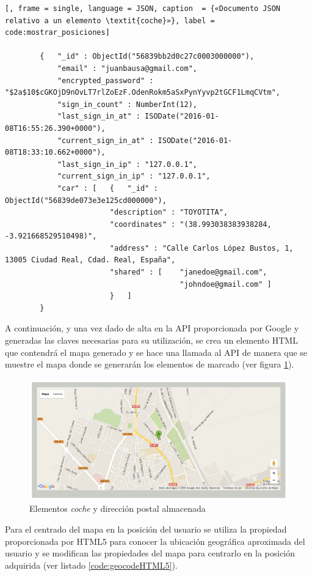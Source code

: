 	\begin{lstlisting}[, frame = single, language = JSON, caption  = {«Documento JSON relativo a un elemento \textit{coche}»}, label = code:mostrar_posiciones]
		
		{   "_id" : ObjectId("56839bb2d0c27c0003000000"), 
		    "email" : "juanbausa@gmail.com", 
		    "encrypted_password" : "$2a$10$cGKOjD9nOvLT7rlZoEzF.OdenRokm5aSxPynYyvp2tGCF1LmqCVtm", 
		    "sign_in_count" : NumberInt(12), 
		    "last_sign_in_at" : ISODate("2016-01-08T16:55:26.390+0000"), 
		    "current_sign_in_at" : ISODate("2016-01-08T18:33:10.662+0000"), 
		    "last_sign_in_ip" : "127.0.0.1", 
		    "current_sign_in_ip" : "127.0.0.1", 
		    "car" : [	{   "_id" : ObjectId("56839de073e3e125cd000000"), 
			            "description" : "TOYOTITA", 
			            "coordinates" : "(38.993038383938284, -3.921668529510498)", 
			            "address" : "Calle Carlos López Bustos, 1, 13005 Ciudad Real, Cdad. Real, España", 
			            "shared" : [	"janedoe@gmail.com", 
			                			"johndoe@gmail.com"	]
			        	}	]	
		}		
	\end{lstlisting}
	
	A continuación, y una vez dado de alta en la API proporcionada por Google y generadas las claves necesarias para su utilización, se crea un elemento HTML que contendrá el mapa generado y se hace una llamada al API de manera que se muestre el mapa donde se generarán los elementos de marcado (ver figura \ref{fig:mostrar_posiciones2}).\\

	\begin{figure}[H]
		\centering
		\includegraphics[width=15cm, fbox={\fboxrule} 4mm]{images/05-resultados/14-mostrar_posiciones_2.png}
		\caption{Elementos \textit{coche} y dirección postal almacenada}
		\label{fig:mostrar_posiciones2}
	\end{figure}
	
	 Para el centrado del mapa en la posición del usuario se utiliza la propiedad proporcionada por HTML5 para conocer la ubicación geográfica aproximada del usuario y se modifican las propiedades del mapa para centrarlo en la posición adquirida (ver listado \ref{code:geocodeHTML5}).
	 
